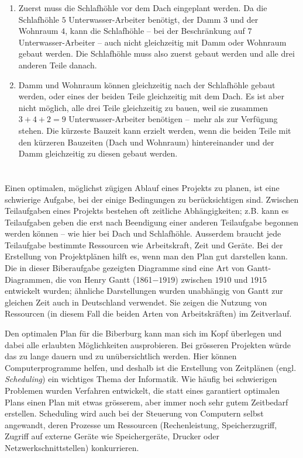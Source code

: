 {{\begin{enumerate}
  \item Zuerst muss die Schlafhöhle vor dem Dach eingeplant werden. Da die Schlafhöhle $5$ Unterwasser-Arbeiter benötigt, der Damm $3$ und der Wohnraum $4$, kann die Schlafhöhle – bei der Beschränkung auf $7$ Unterwasser-Arbeiter – auch nicht gleichzeitig mit Damm oder Wohnraum gebaut werden. Die Schlafhöhle muss also zuerst gebaut werden und alle drei anderen Teile danach.
  \item Damm und Wohnraum können gleichzeitig nach der Schlafhöhle gebaut werden, oder eines der beiden Teile gleichzeitig mit dem Dach. Es ist aber nicht möglich, alle drei Teile gleichzeitig zu bauen, weil sie zusammen ${3 + 4 + 2 = 9}$ Unterwasser-Arbeiter benötigen –~mehr als zur Verfügung stehen. Die kürzeste Bauzeit kann erzielt werden, wenn die beiden Teile mit den kürzeren Bauzeiten (Dach und Wohnraum) hintereinander und der Damm gleichzeitig zu diesen gebaut werden.
\end{enumerate}



\section*{\BrochureItsInformatics}
Einen optimalen, möglichst zügigen Ablauf eines Projekts zu planen, ist eine schwierige Aufgabe, bei der einige Bedingungen zu berücksichtigen sind. Zwischen Teilaufgaben eines Projekts bestehen oft zeitliche Abhängigkeiten; z.B. kann es Teilaufgaben geben die erst nach Beendigung einer anderen Teilaufgabe begonnen werden können – wie hier bei Dach und Schlafhöhle.  Ausserdem braucht jede Teilaufgabe bestimmte Ressourcen wie Arbeitskraft, Zeit und Geräte. Bei der Erstellung von Projektplänen hilft es, wenn man den Plan gut darstellen kann. Die in dieser Biberaufgabe gezeigten Diagramme sind eine Art von Gantt-Diagrammen, die von Henry Gantt (1861$-1919$) zwischen $1910$ und $1915$ entwickelt wurden; ähnliche Darstellungen wurden unabhängig von Gantt zur gleichen Zeit auch in Deutschland verwendet. Sie zeigen die Nutzung von Ressourcen (in diesem Fall die beiden Arten von Arbeitskräften) im Zeitverlauf.

Den optimalen Plan für die Biberburg kann man sich im Kopf überlegen und dabei alle erlaubten Möglichkeiten ausprobieren.  Bei grösseren Projekten würde das zu lange dauern und zu unübersichtlich werden. Hier können Computerprogramme helfen, und deshalb ist die Erstellung von Zeitplänen (engl. \emph{Scheduling}) ein wichtiges Thema der Informatik. Wie häufig bei schwierigen Problemen wurden Verfahren entwickelt, die statt eines garantiert optimalen Plans einen Plan mit etwas grösserem, aber immer noch sehr gutem Zeitbedarf erstellen. Scheduling wird auch bei der Steuerung von Computern selbst angewandt, deren Prozesse um Ressourcen (Rechenleistung, Speicherzugriff, Zugriff auf externe Geräte wie Speichergeräte, Drucker oder Netzwerkschnittstellen) konkurrieren.



}}
